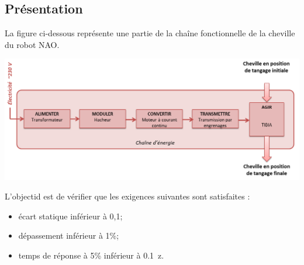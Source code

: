 \documentclass[10pt,fleqn]{article} %
\begin{document}

\vspace{5cm}
\pagestyle{fancy}
\thispagestyle{plain}

\def\columnseprulecolor{\color{ocre}}
\setlength{\columnseprule}{0.4pt} 

\def\pathfig{images}

\begin{multicols}{2}
\section*{Présentation}
La figure ci-dessous représente une partie de la chaîne fonctionnelle de la cheville du robot NAO.
\begin{center}
\includegraphics[width=\linewidth]{images/fig_02}
\end{center}

\begin{obj}
L'objectid est de vérifier que les exigences suivantes sont satisfaites : 
\begin{itemize}
\item écart statique inférieur à 0,1\degres;
\item dépassement inférieur à 1\%;
\item temps de réponse à 5\% inférieur à \SI{0,1}{z}.
\end{itemize}
\end{obj}


\end{multicols}
\end{document}
